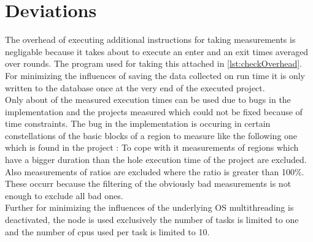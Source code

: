 \section{Deviations}
The overhead of executing additional instructions for taking measurements is negligable because it takes about \measurementOverhead to execute an enter and an exit \overheadIterations times averaged over \overheadRounds rounds.
The program used for taking this attached in \autoref{lst:checkOverhead}.\\
For minimizing the influences of saving the data collected on run time it is only written to the database once at the very end of the executed project.\\
Only about \usefulRatio of the measured execution times can be used due to bugs in the implementation and the projects measured which could not be fixed because of time constraints.
The bug in the implementation is occuring in certain constellations of the basic blocks of a region to measure like the following one which is found in the project :
To cope with it measurements of regions which have a bigger duration than the hole execution time of the project are excluded.
Also measurements of ratios are excluded where the ratio is greater than 100\%.
These occurr because the filtering of the obviously bad measurements is not enough to exclude all bad ones.\\
Further for minimizing the influences of the underlying OS multithreading is deactivated, the node is used exclusively the number of tasks is limited to one and the number of cpus used per task is limited to 10.

